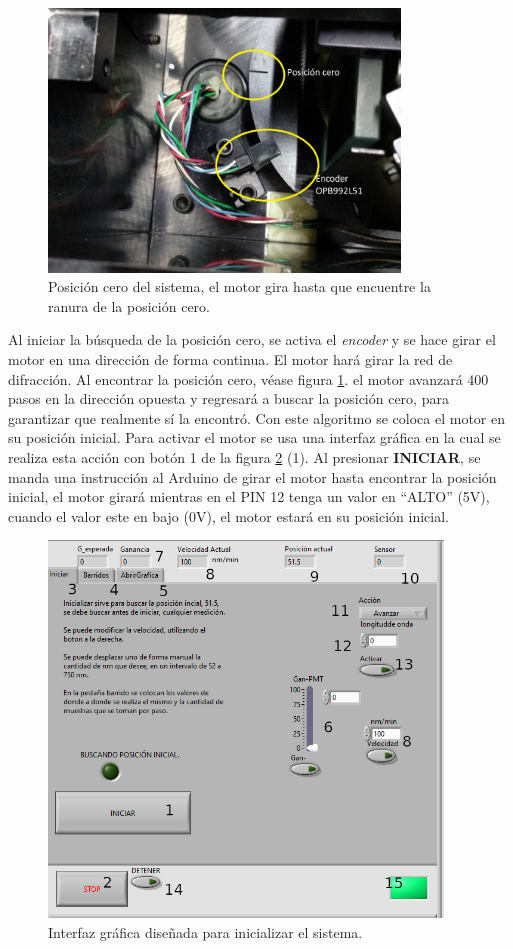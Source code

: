 \begin{figure}[h]
	\centering
	\includegraphics[width=0.7\linewidth,height= 7cm]{Imagenes/3/Encoder_01}
	\caption{Posición cero del sistema, el motor gira hasta que encuentre la ranura de la posición cero.}
	\label{fig:encoder01}
\end{figure}

Al iniciar la búsqueda de la posición cero,
se activa el \textit{encoder} y se hace girar el motor en una dirección de forma continua. El motor hará girar la red de difracción. Al encontrar la posición cero, véase figura \ref{fig:encoder01}. el motor avanzará 400 pasos en la dirección opuesta y regresará a buscar la posición cero, para garantizar que realmente sí la encontró.
Con este algoritmo se coloca el motor en su posición inicial. Para activar el motor se usa una interfaz gráfica en la cual se realiza esta acción con botón 1 de la figura \ref{fig:GUI_01} (1). Al presionar \textbf{INICIAR}, se manda una instrucción al Arduino de girar el motor hasta encontrar la posición inicial, el motor girará mientras en el PIN 12 tenga un valor en ``ALTO'' (5V), cuando el valor este en bajo (0V), el motor estará en su posición inicial.

\begin{figure}[h!]
	\centering
	\includegraphics[width=0.8\linewidth, height=10cm]{Imagenes/3/GUI_01}
	\caption{Interfaz gráfica diseñada para inicializar el sistema.}
	\label{fig:GUI_01}
\end{figure}

